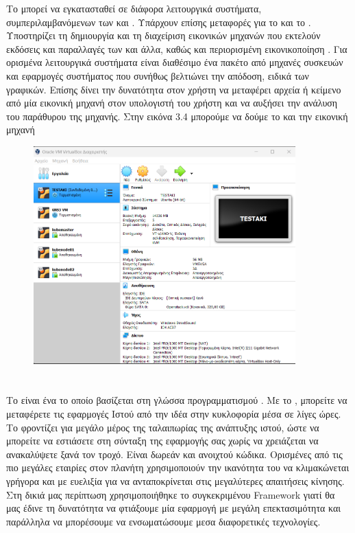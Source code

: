 Το  μπορεί να εγκατασταθεί σε διάφορα λειτουργικά συστήματα, συμπεριλαμβανόμενων των  και .
Υπάρχουν επίσης μεταφορές για το  και το .
Υποστηρίζει τη δημιουργία και τη διαχείριση εικονικών μηχανών που εκτελούν εκδόσεις και παραλλαγές των 
και άλλα, καθώς και περιορισμένη εικονικοποίηση .
Για ορισμένα λειτουργικά συστήματα είναι διαθέσιμο ένα πακέτο  από μηχανές συσκευών και εφαρμογές συστήματος
που συνήθως βελτιώνει την απόδοση, ειδικά των γραφικών. Επίσης δίνει την δυνατότητα στον χρήστη να μεταφέρει αρχεία ή κείμενο από μία εικονική μηχανή στον υπολογιστή του χρήστη και να αυξήσει την ανάλυση του παράθυρου της μηχανής. 
Στην εικόνα 3.4 μπορούμε να δούμε το  και την εικονική μηχανή 

\begin{figure}[htb]
	\centering
	\includegraphics[width=0.9\textwidth]{graphics/virtualbox.PNG}
	\caption{ }
\end{figure}

\section{}

Το  είναι ένα  το οποίο βασίζεται στη γλώσσα προγραμματισμού . Με το , μπορείτε να μεταφέρετε τις εφαρμογές Ιστού από την ιδέα στην κυκλοφορία μέσα σε λίγες ώρες. Το  φροντίζει για μεγάλο μέρος
της ταλαιπωρίας της ανάπτυξης ιστού, ώστε να μπορείτε να εστιάσετε στη σύνταξη της εφαρμογής σας χωρίς να χρειάζεται να ανακαλύψετε ξανά τον τροχό.
Είναι δωρεάν και ανοιχτού κώδικα. Ορισμένες από τις πιο μεγάλες εταιρίες στον πλανήτη χρησιμοποιούν την ικανότητα του
να κλιμακώνεται γρήγορα και με ευελιξία για να ανταποκρίνεται στις μεγαλύτερες απαιτήσεις κίνησης. Στη δικιά μας περίπτωση χρησιμοποιήθηκε το συγκεκριμένου
{Framework} γιατί θα μας έδινε τη δυνατότητα να φτιάξουμε μία εφαρμογή με μεγάλη επεκτασιμότητα και παράλληλα να μπορέσουμε να ενσωματώσουμε μεσα διαφορετικές τεχνολογίες.

